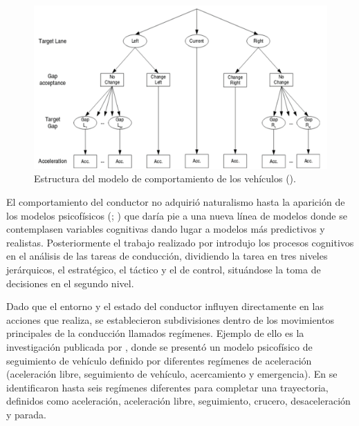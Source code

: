 \begin{figure}[h]
  \centering
  \includegraphics[width=12.5cm]{figures/2.4.png}
  \caption{\label{fig:2.4} Estructura del modelo de comportamiento de los vehículos (\cite{toledo07}).}
\end{figure}

El comportamiento del conductor no adquirió naturalismo hasta la aparición de los modelos psicofísicos (\cite{michaels}; \cite{wiedemann74}) que daría pie a una nueva línea de modelos donde se contemplasen variables cognitivas dando lugar a modelos más predictivos y realistas. Posteriormente el trabajo realizado por \textcite{michon} introdujo los procesos cognitivos en el análisis de las tareas de conducción, dividiendo la tarea en tres niveles jerárquicos, el estratégico, el táctico y el de control, situándose la toma de decisiones en el segundo nivel.

Dado que el entorno y el estado del conductor influyen directamente en las acciones que realiza, se establecieron subdivisiones dentro de los movimientos principales de la conducción llamados regímenes. Ejemplo de ello es la investigación publicada por \textcite{wiedemann92}, donde se presentó un modelo psicofísico de seguimiento de vehículo definido por diferentes regímenes de aceleración (aceleración libre, seguimiento de vehículo, acercamiento y emergencia). En \textcite{sharma19} se identificaron hasta seis regímenes diferentes para completar una trayectoria, definidos como aceleración, aceleración libre, seguimiento, crucero, desaceleración y parada. 

